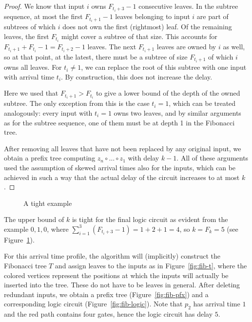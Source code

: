 \documentclass[11pt,final,microtype]{scrartcl}
\theoremstyle{plain}
\theoremstyle{definition}
\theoremstyle{remark}
\newcommand{\tikzc}[3]{
  \centering{
    \resizebox{#2\linewidth}{!}{
      \begin{tikzpicture}
        
      \end{tikzpicture}
    }
    \caption{#1}
    \label{fig:#3}}
}
\begin{document}
\begin{proof}
  We know that input $i$ owns $F_{t_i+3}-1$ consecutive leaves. In the
  subtree sequence, at most the first $F_{t_i+1}-1$ leaves belonging to
  input $i$ are part of subtrees of which $i$ does not own the first
  (rightmost) leaf. Of the remaining leaves, the first $F_{t_i}$
  might cover a subtree of that size. This accounts for $F_{t_i+1}
  + F_{t_i} -1 = F_{t_i+2}-1$ leaves. The next $F_{t_i+1}$ leaves are
  owned by $i$ as well, so at that point, at the latest, there must be
  a subtree of size $F_{t_i+1}$ of which $i$ owns all leaves. For $t_i
  \neq 1$, we can replace the root of this subtree with one input with
  arrival time $t_i$. By construction, this does not increase the
  delay.

  Here we used that $F_{t_i+1} > F_{t_i}$ to give a lower bound of the
  depth of the owned subtree. The only exception from this is the case
  $t_i = 1$, which can be treated analogously: every input with
  $t_i=1$ owns two leaves, and by similar arguments as for the subtree
  sequence, one of them must be at depth 1 in the Fibonacci tree. 

  After removing all leaves that have not been replaced by any
  original input, we obtain a prefix tree computing $z_n \circ \dots
  \circ z_1$ with delay $k-1$. All of these arguments used the
  assumption of skewed arrival times also for the inputs, which can be achieved in such a
  way that the actual delay of the circuit increases to at most $k$.
\end{proof}

\begin{figure}[!t]
  \centering
  \begin{subfigure}[b]{.1\linewidth}
    \tikzc{$T$ for $k = 5$}{1}{fib-t}
  \end{subfigure}
  \qquad
  \begin{subfigure}[b]{.12\linewidth}
    \tikzc{Prefix tree}{1}{fib-pfx}
  \end{subfigure}
  \qquad
  \begin{subfigure}[b]{.2\linewidth}
    \tikzc{Logic circuit}{1}{fib-logic}
  \end{subfigure}
  \caption{A tight example}
  \label{fig:fib-tight} 
\end{figure}
The upper bound of $k$ is tight for the final logic circuit as
evident from the example $0, 1, 0$, where $\sum_{i=1}^3 (F_{t_i+3} -
1) = 1 + 2 + 1 = 4$, so $k = F_k = 5$ (see
Figure~\ref{fig:fib-tight}).

For this arrival time profile, the algorithm will (implicitly)
construct the Fibonacci tree $T$ and assign leaves to the inputs as in
Figure~\ref{fig:fib-t}, where the colored vertices represent the
positions at which the inputs will actually be inserted into the
tree. These do not have to be leaves in general. After deleting
redundant inputs, we obtain a prefix tree (Figure~\ref{fig:fib-pfx})
and a corresponding logic circuit (Figure~\ref{fig:fib-logic}). Note
that $p_2$ has arrival time $1$ and the red path contains four gates,
hence the logic circuit has delay $5$.
\end{document}
